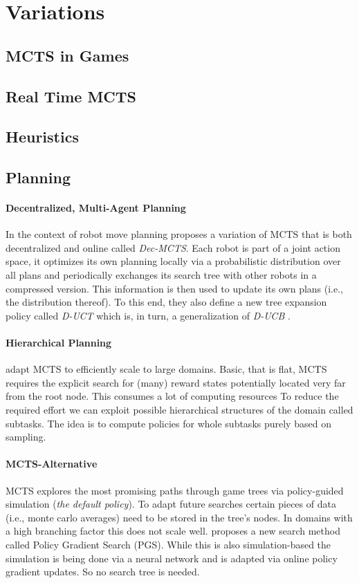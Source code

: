 \section{Variations}
\label{sec:variations}
\subsection{MCTS in Games}
\subsection{Real Time MCTS}
\subsection{Heuristics}
\subsection{Planning}
\paragraph{Decentralized, Multi-Agent Planning}
In the context of robot move planning \cite{best2019dec} proposes a variation of MCTS that is both decentralized and online called \textit{Dec-MCTS}. Each robot is part of a joint action space, it optimizes its own planning locally via a probabilistic distribution over all plans and periodically exchanges its search tree with other robots in a compressed version. This information is then used to update its own plans (i.e., the distribution thereof). To this end, they also define a new tree expansion policy called \textit{D-UCT} which is, in turn, a generalization of \textit{D-UCB} \cite{garivier2011upper}.
\paragraph{Hierarchical Planning}
\cite{vien2015hierarchical} adapt MCTS to efficiently scale to large domains. Basic, that is flat, MCTS requires the explicit search for (many) reward states potentially located very far from the root node. This consumes a lot of computing resources To reduce the required effort we can exploit possible hierarchical structures of the domain called subtasks. The idea is to compute policies for whole subtasks purely based on sampling.
\paragraph{MCTS-Alternative}
MCTS explores the most promising paths through game trees via policy-guided simulation (\textit{the default policy}). To adapt future searches certain pieces of data (i.e., monte carlo averages) need to be stored in the tree's nodes. In domains with a high branching factor this does not scale well. \cite{anthony2019policy} proposes a new search method called Policy Gradient Search (PGS). While this is also simulation-based the simulation is being done via a neural network and is adapted via online policy gradient updates. So no search tree is needed.
